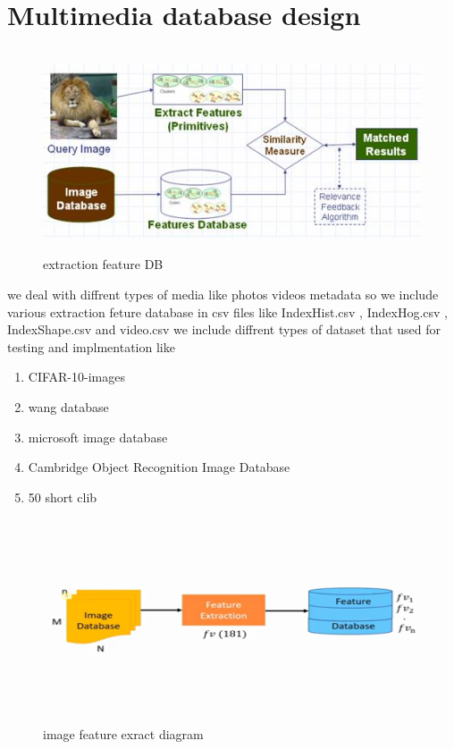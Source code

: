 \documentclass[pdftex,10pt,a4paper,oneside]{article}
\begin{document}
	\section{Multimedia database design}
	\begin{figure}[H]
		\centering
		\includegraphics[width=120mm,height=60mm]{fig/18.png}
		\caption{extraction feature DB  }
		\label{extraction feature DB }
	\end{figure}
	we deal with diffrent types of media like photos videos metadata 
	so we include various extraction feture database in csv files like IndexHist.csv , IndexHog.csv , IndexShape.csv and video.csv
	we include diffrent types of dataset that used for testing and implmentation like 
	\begin{enumerate}
		\item CIFAR-10-images
		\item wang database
		\item microsoft image database
		\item Cambridge Object Recognition Image Database 
		\item 50 short clib
	\end{enumerate} 
\begin{figure}[H]
	\centering
	\includegraphics[width=120mm,height=60mm]{fig/21.png}
	\caption{image feature exract diagram }
	\label{image feature exract diagram}
\end{figure}
\end{document}
